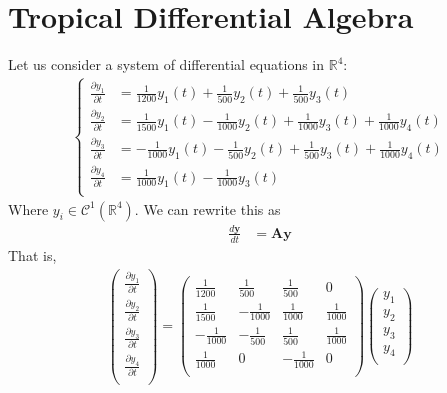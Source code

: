 \documentclass{article}
\theoremstyle{definition}
\newcommand{\R}{\mathbb{R}}
\begin{document}
\section{Tropical Differential Algebra}
Let us consider a system of differential equations in $\R^4$:
\begin{align*}
\begin{cases}
	\frac{\partial y_1}{\partial t}&=\frac{1}{1200}y_1(t)+\frac{1}{500}y_2(t)+\frac{1}{500}y_3(t)\\
	\frac{\partial y_2}{\partial t}&=\frac{1}{1500}y_1(t)-\frac{1}{1000}y_2(t)+\frac{1}{1000}y_3(t)+\frac{1}{1000}y_4(t)\\
	\frac{\partial y_3}{\partial t}&=-\frac{1}{1000}y_1(t)-\frac{1}{500}y_2(t)+\frac{1}{500}y_3(t)+\frac{1}{1000}y_4(t)\\
 	\frac{\partial y_4}{\partial t}&=\frac{1}{1000}y_1(t)-\frac{1}{1000}y_3(t)\\
\end{cases}
\end{align*}
Where $y_i\in\mathcal C^1(\R^4)$. We can rewrite this as
\begin{align*}
\frac{{d\mathbf{y}}}{{dt}} &= \mathbf{A}\mathbf{y}
\end{align*}
That is,
\begin{align*}
\begin{pmatrix}
\frac{\partial y_1}{\partial t} \\
\frac{\partial y_2}{\partial t} \\
\frac{\partial y_3}{\partial t} \\
\frac{\partial y_4}{\partial t} \\
\end{pmatrix}=
\begin{pmatrix}
\frac{1}{1200} & \frac{1}{500} & \frac{1}{500} & 0 \\
\frac{1}{1500} & -\frac{1}{1000} & \frac{1}{1000} & \frac{1}{1000} \\
-\frac{1}{1000} & -\frac{1}{500} & \frac{1}{500} & \frac{1}{1000} \\
\frac{1}{1000} & 0 & -\frac{1}{1000} & 0 \\
\end{pmatrix}
\begin{pmatrix}
y_1 \\
y_2 \\
y_3 \\
y_4 \\
\end{pmatrix}
\end{align*}
\end{document}

